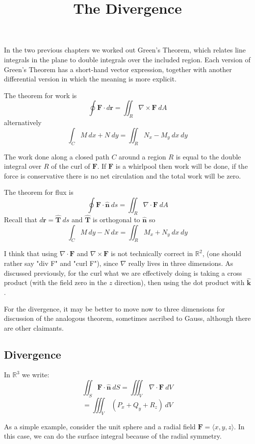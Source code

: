 \documentclass[11pt, oneside]{article}
\title{The Divergence}
\date{}
\begin{document}
\maketitle
\Large

In the two previous chapters we worked out Green's Theorem, which relates line integrals in the plane to double integrals over the included region.  Each version of Green's Theorem has a short-hand vector expression, together with another differential version in which the meaning is more explicit.  

The theorem for work is
\[ \oint \mathbf{F} \cdot d \mathbf{r} = \iint_R \nabla \times \mathbf{F} \ dA \]
alternatively
\[ \int_C M \ dx + N \ dy = \iint_R N_x - M_y \ dx \ dy \]

The work done along a closed path $C$ around a region $R$ is equal to the double integral over $R$ of the curl of $\mathbf{F}$.  If $\mathbf{F}$ is a whirlpool then work will be done, if the force is conservative there is no net circulation and the total work will be zero.

The theorem for flux is
\[ \oint \mathbf{F} \cdot  \mathbf{\hat{n}} \ ds  = \iint_R \nabla \cdot \mathbf{F} \ dA \]
Recall that $d\mathbf{r} = \mathbf{\hat{T}} \ ds$ and $\mathbf{\hat{T}}$ is orthogonal to $\mathbf{\hat{n}}$ so
\[ \int_C M \ dy - N \ dx = \iint_R M_x + N_y \ dx \ dy \]

I think that using $\nabla \cdot \mathbf{F}$ and $\nabla \times \mathbf{F}$ is not technically correct in $\mathbb{R}^2$, (one should rather say "div F" and "curl F"), since $\nabla$ really lives in three dimensions.  As discussed previously, for the curl what we are effectively doing is taking a cross product (with the field zero in the $z$ direction), then using the dot product with $\mathbf{\hat{k}}$.  

For the divergence, it may be better to move now to three dimensions for discussion of the analogous theorem, sometimes ascribed to Gauss, although there are other claimants.

\subsection*{Divergence}

In $\mathbb{R}^3$ we write:
\[ \iint_S \mathbf{F} \cdot \mathbf{\hat{n}} \ dS  = \iiint_V \ \nabla \cdot \mathbf{F} \ dV \]
\[ =  \iiint_V \ (P_x + Q_y + R_z )\ dV \]

As a simple example, consider the unit sphere and a radial field $\mathbf{F} = \langle x,y,z \rangle$.  In this case, we can do the surface integral because of the radial symmetry.  
\end{document}
